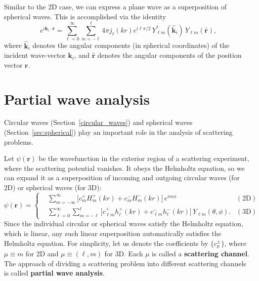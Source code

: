 \documentclass[pra,12pt]{revtex4-2}
\begin{document}
Similar to the 2D case, we can express a plane wave as a superposition
of spherical waves.  This is accomplished via the identity
\begin{equation}
  e^{i\mathbf{k}_i \cdot \mathbf{r}}
  = \sum_{\ell=0}^\infty \sum_{m=-\ell}^\ell 4 \pi j_{\ell}(kr) e^{i\ell\pi/2} \,
  Y_{\ell m}^*(\hat{\mathbf{k}}_i) \, Y_{\ell m}(\hat{\mathbf{r}}),
  \label{plane_wave_decomp}
\end{equation}
where $\hat{\mathbf{k}}_i$ denotes the angular components (in
spherical coordinates) of the incident wave-vector $\mathbf{k}_i$, and
$\hat{\mathbf{r}}$ denotes the angular components of the position
vector $\mathbf{r}$.

\section{Partial wave analysis}
\label{sec:scattering}

Circular waves (Section~\ref{circular_waves}) and spherical waves
(Section~\ref{sec:spherical}) play an important role in the analysis
of scattering problems.

Let $\psi(\mathbf{r})$ be the wavefunction in the exterior region of a
scattering experiment, where the scattering potential vanishes.  It
obeys the Helmholtz equation, so we can expand it as a superposition
of incoming and outgoing circular waves (for 2D) or spherical waves
(for 3D):
\begin{equation}
  \psi(\mathbf{r}) =
  \left\{
  \begin{aligned}
    &\sum_{m=-\infty}^\infty
    \Big[c_m^+ H_m^+(kr) + c_m^- H_m^-(kr)\Big] \, e^{im\phi}
    & (\textrm{2D})
    \\
    &\sum_{\ell = 0}^\infty \sum_{m = - \ell}^\ell
    \Big[c_{\ell m}^+ h_\ell^+(kr) + c_{\ell m}^- h_\ell^-(kr)\Big] \,
    Y_{\ell m}(\theta, \phi). & (\textrm{3D})
  \end{aligned}\right.
  \label{psirdecomp}
\end{equation}
Since the individual circular or spherical waves satisfy the Helmholtz
equation, which is linear, any such linear superposition automatically
satisfies the Helmholtz equation.  For simplicity, let us denote the
coefficients by $\{c_\mu^\pm\}$, where $\mu \equiv m$ for 2D and $\mu
\equiv (\ell, m)$ for 3D.  Each $\mu$ is called a \textbf{scattering
  channel}.  The approach of dividing a scattering problem into
different scattering channels is called \textbf{partial wave
  analysis}.
\end{document}
